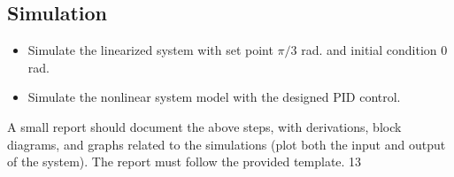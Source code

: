 \documentclass[12pt]{article}
\begin{document}
\subsection*{Simulation}

\begin{itemize}
  \item Simulate the linearized system with set point $\pi/3$ rad. and initial condition 0 rad.
  \item Simulate the nonlinear system model with the designed PID control.
\end{itemize}

A small report should document the above steps, with derivations, block diagrams, and graphs related
to the simulations (plot both the input and output of the system). The report must follow the provided
template.
13
\end{document}
